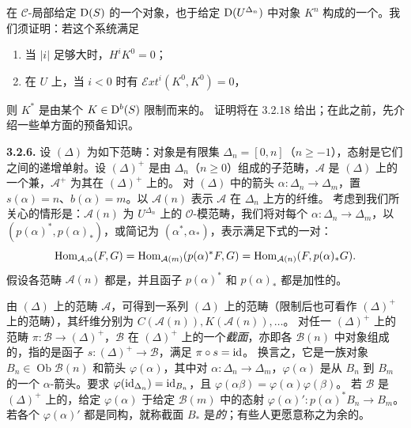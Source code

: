 在 $\mathscr C$-局部给定 $\mathrm{D}(S)$ 的一个对象，也于给定 $\mathrm{D}(U^{\Delta_n})$ 中对象 $K^n$ 构成的一个。我们须证明：若这个系统满足
\begin{enumerate}[label=\(\alph*\)]
\item 当 $|i|$ 足够大时，$H^iK^0=0$；
\item 在 $U$ 上，当 $i<0$ 时有 $\mathcal E\!xt^i(K^0,K^0)=0$，
\end{enumerate}
则 $K^*$ 是由某个 $K\in\mathrm{D}^b(S)$ 限制而来的。
证明将在 3.2.18 给出；在此之前，先介绍一些单方面的预备知识。

\par\medskip\noindent\textbf{3.2.6.}
设 $(\Delta)$ 为如下范畴：对象是有限集 $\Delta_n=[0,n]$（$n\geq-1$），态射是它们之间的递增单射。设 $(\Delta)^+$ 是由 $\Delta_n$（$n\geq0$）组成的子范畴，$\mathcal A$ 是 $(\Delta)$ 上的一个兼，$\mathcal A^+$ 为其在 $(\Delta)^+$ 上的。
对 $(\Delta)$ 中的箭头 $\alpha:\Delta_n\longrightarrow\Delta_m$，置
$s(\alpha)=n$、$b(\alpha)=m$。以 $\mathcal A(n)$ 表示 $\mathcal A$ 在 $\Delta_n$ 上方的纤维。
考虑到我们所关心的情形是：$\mathcal A(n)$ 为 $U^{\Delta_n}$ 上的 $\mathcal O$-模范畴，我们将对每个 $\alpha:\Delta_n\longrightarrow\Delta_m$，以
$(p(\alpha)^*,p(\alpha)_*)$，或简记为 $(\alpha^*,\alpha_*)$，表示满足下式的一对：
\[
\operatorname{Hom}_{\mathcal A,\alpha}(F,G)
 =\operatorname{Hom}_{\mathcal A(m)}(p(\alpha)^*F,G)
 =\operatorname{Hom}_{\mathcal A(n)}(F,p(\alpha)_*G).
\]
假设各范畴 $\mathcal A(n)$ 都是，并且函子 $p(\alpha)^*$ 和 $p(\alpha)_*$ 都是加性的。

由 $(\Delta)$ 上的范畴 $\mathcal A$，可得到一系列 $(\Delta)$ 上的范畴（限制后也可看作 $(\Delta)^+$ 上的范畴），其纤维分别为
$C(\mathcal A(n)),K(\mathcal A(n)),\ldots$。
对任一 $(\Delta)^+$ 上的范畴 $\pi:\mathcal B\longrightarrow(\Delta)^+$，$\mathcal B$ 在 $(\Delta)^+$ 上的一个\emph{截面}，亦即各 $\mathcal B(n)$ 中对象组成的，指的是函子
$s:(\Delta)^+\longrightarrow\mathcal B$，满足 $\pi\circ s=\operatorname{id}$。
换言之，它是一族对象 $B_n\in\operatorname{Ob}\mathcal B(n)$ 和箭头 $\varphi(\alpha)$，其中对 $\alpha:\Delta_n\longrightarrow\Delta_m$，$\varphi(\alpha)$ 是从 $B_n$ 到 $B_m$ 的一个 $\alpha$-箭头。要求
$\varphi(\operatorname{id}_{\Delta_n})=\operatorname{id}_{B_n}$，且
$\varphi(\alpha\beta)=\varphi(\alpha)\varphi(\beta)$。
若 $\mathcal B$ 是 $(\Delta)^+$ 上的，给定 $\varphi(\alpha)$ 于给定 $\mathcal B(m)$ 中的态射
$\varphi(\alpha)':p(\alpha)^*B_n\longrightarrow B_m$。
若各个 $\varphi(\alpha)'$ 都是同构，就称截面 $B_*$ 是\emph{的}；有些人更愿意称之为余的。

